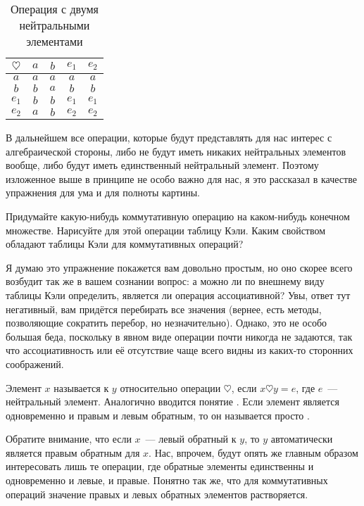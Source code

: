 \begin{table}[h]\label{tb:alg_2neutr}
\centering
\begin{tabular}{c|cccc}
$\heartsuit$ & $a$ & $b$ & $e_1$ & $e_2$ \\
\hline
$a$ & $a$ & $a$ & $a$ & $a$ \\
$b$ & $b$ & $a$ & $b$ & $b$ \\
$e_1$ & $b$ & $b$ & $e_1$ & $e_1$ \\
$e_2$ & $a$ & $b$ & $e_2$ & $e_2$
\end{tabular}
\caption{Операция с двумя нейтральными элементами}
\end{table}

В дальнейшем все операции, которые будут представлять для нас интерес с алгебраической стороны, либо не будут иметь никаких нейтральных элементов вообще, либо будут иметь единственный нейтральный элемент. Поэтому изложенное выше в принципе не особо важно для нас, я это рассказал в качестве упражнения для ума и для полноты картины.

\begin{exercise}
Придумайте какую-нибудь коммутативную операцию на каком-нибудь конечном множестве. Нарисуйте для этой операции таблицу Кэли. Каким свойством обладают таблицы Кэли для коммутативных операций?
\end{exercise}

Я думаю это упражнение покажется вам довольно простым, но оно скорее всего возбудит так же в вашем сознании вопрос: а можно ли по внешнему виду таблицы Кэли определить, является ли операция ассоциативной? Увы, ответ тут негативный, вам придётся перебирать все значения (вернее, есть методы, позволяющие сократить перебор, но незначительно). Однако, это не особо большая беда, поскольку в явном виде операции почти никогда не задаются, так что ассоциативность или её отсутствие чаще всего видны из каких-то сторонних соображений.

\begin{definition}
Элемент $x$ называется  к $y$ относительно операции $\heartsuit$, если
$x\heartsuit y = e$, 
где $e$~--- нейтральный элемент. Аналогично вводится понятие . Если элемент является одновременно и правым и левым обратным, то он называется просто .
\end{definition}

Обратите внимание, что если $x$~--- левый обратный к $y$, то $y$ автоматически является правым обратным для $x$. Нас, впрочем, будут опять же главным образом интересовать лишь те операции, где обратные элементы единственны и одновременно и левые, и правые. Понятно так же, что для коммутативных операций значение правых и левых обратных элементов растворяется.

